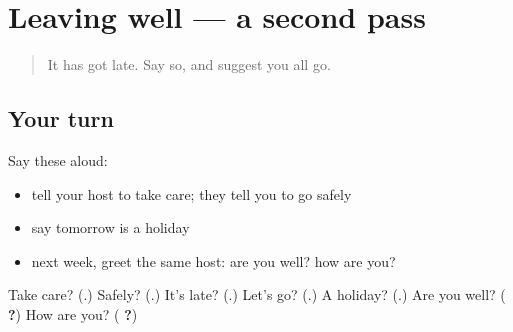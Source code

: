 \section[(dialogue)]{Leaving well — a second pass}

\label{lesson:TA-R108-second-pass-care}



\begin{quote}
It has got late. Say so, and suggest you all go.
\end{quote}

\subsection*{Your turn}
Say these aloud:

\begin{itemize}
\raggedright
  \item tell your host to take care; they tell you to go safely
  \item say tomorrow is a holiday
  \item next week, greet the same host: are you well? how are you?
\end{itemize}

\begin{tcolorbox}[breakable,colback=teal!4,colframe=teal!35!black,title={Before you move on}]
Take care? (\textbf{}.) Safely? (\textbf{}.) It's late? (\textbf{}.) Let's go? (\textbf{}.) A holiday? (\textbf{}.) Are you well? (\textbf{ ?}) How are you? (\textbf{ ?})
\end{tcolorbox}
